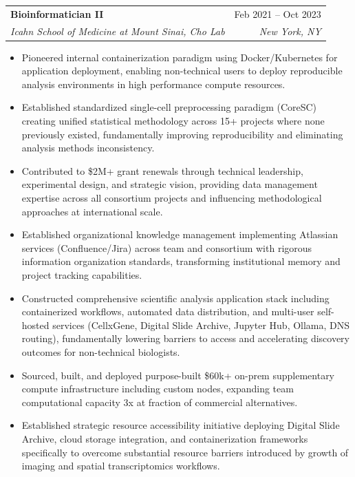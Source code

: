 \documentclass[letterpaper,11pt]{article}
\makeatletter
\newcommand{\resumeItem}[1]{
  \item\small{
    {#1 \vspace{-2pt}}
  }
}
\newcommand{\resumeSubheading}[4]{
  \vspace{-2pt}\item
    \begin{tabular*}{0.97\textwidth}[t]{l@{\extracolsep{\fill}}r}
      \textbf{#1} & #2 \\
      \textit{\small#3} & \textit{\small #4} \\
    \end{tabular*}\vspace{-7pt}
}
\newcommand{\resumeItemListStart}{\begin{itemize}}
\newcommand{\resumeItemListEnd}{\end{itemize}\vspace{-5pt}}
\makeatother
\begin{document}
    \resumeSubheading
      {Bioinformatician II}{Feb 2021 -- Oct 2023}
      {Icahn School of Medicine at Mount Sinai, Cho Lab}{New York, NY}
      \resumeItemListStart
        \resumeItem{Pioneered internal containerization paradigm using Docker/Kubernetes for application deployment, enabling non-technical users to deploy reproducible analysis environments in high performance compute resources.}
        \resumeItem{Established standardized single-cell preprocessing paradigm (CoreSC) creating unified statistical methodology across 15+ projects where none previously existed, fundamentally improving reproducibility and eliminating analysis methods inconsistency.}
        \resumeItem{Contributed to \$2M+ grant renewals through technical leadership, experimental design, and strategic vision, providing data management expertise across all consortium projects and influencing methodological approaches at international scale.}
        \resumeItem{Established organizational knowledge management implementing Atlassian services (Confluence/Jira) across team and consortium with rigorous information organization standards, transforming institutional memory and project tracking capabilities.}
        \resumeItem{Constructed comprehensive scientific analysis application stack including containerized workflows, automated data distribution, and multi-user self-hosted services (CellxGene, Digital Slide Archive, Jupyter Hub, Ollama, DNS routing), fundamentally lowering barriers to access and accelerating discovery outcomes for non-technical biologists.}
        \resumeItem{Sourced, built, and deployed purpose-built \$60k+ on-prem supplementary compute infrastructure including custom nodes, expanding team computational capacity 3x at fraction of commercial alternatives.}
        \resumeItem{Established strategic resource accessibility initiative deploying Digital Slide Archive, cloud storage integration, and containerization frameworks specifically to overcome substantial resource barriers introduced by growth of imaging and spatial transcriptomics workflows.}
      \resumeItemListEnd
\end{document}
